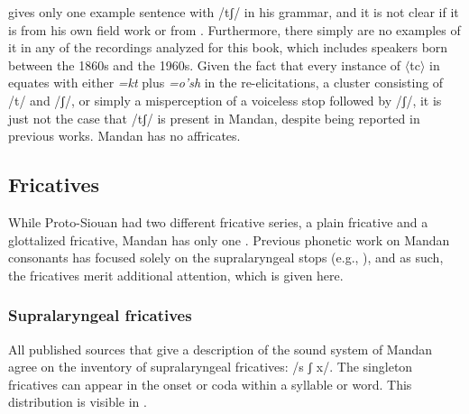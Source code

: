 \citet[26]{mixco1997a} gives only one example sentence with /tʃ/ in his grammar, and it is not clear if it is from his own field work or from \citet{kennard1934}. Furthermore, there simply are no examples of it in any of the recordings analyzed for this book, which includes speakers born between the 1860s and the 1960s. Given the fact that every instance of $\langle$tc$\rangle$ in \citet{kennard1934,kennard1936} equates with either \textit{=kt} plus \textit{=o'sh} in the \citet{hollow1973b} re-elicitations, a cluster consisting of /t/ and /ʃ/, or simply a misperception of a voiceless stop followed by /ʃ/, it is just not the case that /tʃ/ is present in Mandan, despite being reported in previous works. Mandan has no affricates.

\subsection{Fricatives}\label{fricatives}

While Proto-Siouan had two different fricative series, a plain fricative and a glottalized fricative, Mandan has only one \citep{rankinetalnd}. Previous phonetic work on Mandan consonants has focused solely on the supralaryngeal stops (e.g., \citealt{torres2013a}), and as such, the fricatives merit additional attention, which is given here.

\subsubsection{Supralaryngeal fricatives}\label{suprafrics}

All published sources that give a description of the sound system of Mandan agree on the inventory of supralaryngeal fricatives: /s ʃ x/. The singleton fricatives can appear in the onset or coda within a syllable or word. This distribution is visible in .

